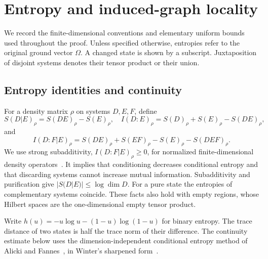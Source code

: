 \section{Entropy and induced-graph locality}\label{sec:prelim}

We record the finite-dimensional conventions and elementary uniform bounds
used throughout the proof. Unless specified otherwise, entropies refer to the
original ground vector $\Omega$. A changed state is shown by a subscript.
Juxtaposition of disjoint systems denotes their tensor product or their union.

\subsection{Entropy identities and continuity}

For a density matrix $\rho$ on systems $D,E,F$, define
\[
 S(D|E)_\rho=S(DE)_\rho-S(E)_\rho,
 \quad I(D:E)_\rho=S(D)_\rho+S(E)_\rho-S(DE)_\rho,
\]
and
\[
 I(D:F|E)_\rho=S(DE)_\rho+S(EF)_\rho-S(E)_\rho-S(DEF)_\rho.
\]
We use strong subadditivity, $I(D:F|E)_\rho\ge0$, for normalized
finite-dimensional density operators~\cite{LiebRuskai1973}.
It implies that conditioning decreases conditional entropy and that discarding
systems cannot increase mutual information. Subadditivity and purification
give $|S(D|E)|\le\log\dim D$. For a pure state the entropies of complementary
systems coincide. These facts also hold with empty regions, whose
Hilbert spaces are the one-dimensional empty tensor product.

Write $h(u)=-u\log u-(1-u)\log(1-u)$ for binary entropy.
The trace distance of two states is half the trace norm of their difference.
The continuity estimate below uses the dimension-independent conditional
entropy method of Alicki and Fannes~\cite{AlickiFannes2004}, in Winter's
sharpened form~\cite{Winter2016}.

